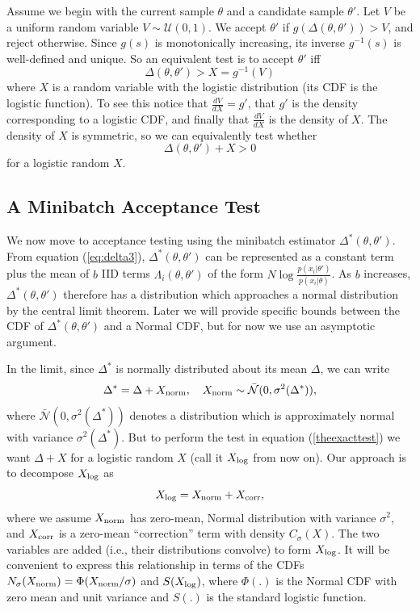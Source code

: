 \documentclass{article}
\begin{document}
Assume we begin with the current sample $\theta$  and a
candidate sample $\theta'$. Let $V$ be a uniform random variable $V \sim
\mathcal{U}(0,1)$. We accept $\theta'$ if $g(\Delta(\theta,\theta')) > V$, and reject otherwise.
Since $g(s)$ is monotonically increasing, its inverse $g^{-1}(s)$ is well-defined and
unique. So an equivalent test is to accept $\theta'$ iff
\begin{equation}
  \Delta(\theta,\theta') > X = g^{-1}(V)
\end{equation}
where $X$ is a random variable with the logistic distribution (its CDF is the logistic function). To
see this notice that $\frac{dV}{dX} = g'$, that $g'$ is the density corresponding to a logistic
CDF, and finally that $\frac{dV}{dX}$ is the density of $X$. The density of $X$ is symmetric,
so we can equivalently test whether
\begin{equation}
  \label{theexacttest}
  \Delta(\theta,\theta') + X > 0
\end{equation}
for a logistic random $X$. 


\subsection{A Minibatch Acceptance Test}\label{ssec:deltas_minibatch}

We now move to acceptance testing using the minibatch estimator
$\Delta^*(\theta,\theta')$. From equation (\ref{eq:delta3}),
$\Delta^*(\theta,\theta')$ can be represented as a constant term
plus the mean of $b$ IID terms $\Lambda_i(\theta,\theta')$ of the form
$N\log\frac{p(x_i|\theta')}{p(x_i|\theta)}$. As $b$ increases, $\Delta^*(\theta,\theta')$
therefore has a distribution which approaches a normal distribution by the central limit
theorem. Later we will provide specific bounds between the CDF of $\Delta^*(\theta,\theta')$
and a Normal CDF, but for now we use an asymptotic argument. 

In the limit, since $\Delta^*$ is normally distributed about its mean $\Delta$, we
can write
\begin{equation}\label{eq:relationship}
\Delta^* = \Delta + X_{\rm norm}, \quad X_{\rm norm} \sim \mathcal{\bar{N}}(0, \sigma^2(\Delta^*)),
\end{equation}
where $\mathcal{\bar{N}}(0, \sigma^2(\Delta^*))$ denotes a distribution which is approximately
normal with variance $\sigma^2(\Delta^*)$. 
But to perform the test in equation (\ref{theexacttest}) we want $\Delta + X$ for
a logistic random $X$ (call it $X_{\rm log}$ from now on). 
Our approach is to decompose $X_{\rm log}$ as
\begin{equation}\label{eq:deconvolution}
X_{\rm log} = X_{\rm norm}+X_{\rm corr},
\end{equation}
where we assume $X_{\rm norm}$ has zero-mean, Normal distribution with
variance $\sigma^2$, and $X_{\rm corr}$ is a zero-mean ``correction''
term with density $C_{\sigma}(X)$.  The two variables are added
(i.e., their distributions convolve) to form $X_{\rm log}$. It will be
convenient to express this relationship in terms of the CDFs $N_{\sigma}(X_{\rm
  norm}) = \Phi(X_{\rm norm}/\sigma)$ and $S(X_{\rm log})$, where
$\Phi(.)$ is the Normal CDF with zero mean and unit variance and
$S(.)$ is the standard logistic function.
 
\end{document}
